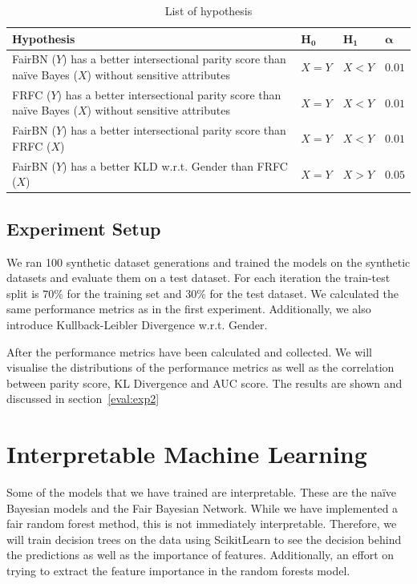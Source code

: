 \begin{table}
    \centering
    \begin{tabular}{p{10cm}lll}
        \hline
        \textbf{Hypothesis} & $\boldsymbol{H_0}$ & $\boldsymbol{H_1}$ & $\boldsymbol{\alpha}$ \\
        \hline
        \hline
        FairBN ($Y$) has a better intersectional parity score than naïve Bayes ($X$) without sensitive attributes & $X = Y$ & $X < Y$ & $0.01$ \\ \hline
        FRFC ($Y$) has a better intersectional parity score than naïve Bayes ($X$) without sensitive attributes & $X = Y$ & $X < Y$ & $0.01$ \\ \hline
        FairBN ($Y$) has a better intersectional parity score than FRFC ($X$) & $X = Y$ & $X < Y$ & $0.01$ \\ \hline
        FairBN ($Y$) has a better KLD w.r.t. Gender than FRFC ($X$) & $X = Y$ & $X > Y$ & $0.05$ \\ \hline
    \end{tabular}
    \caption{List of hypothesis}
    \label{tab:hypothesis}
\end{table}

\subsection{Experiment Setup}

We ran 100 synthetic dataset generations and trained the models on the synthetic datasets and evaluate them on a test dataset. For each iteration the train-test split is $70\%$ for the training set and $30\%$ for the test dataset. We calculated the same performance metrics as in the first experiment. Additionally, we also introduce Kullback-Leibler Divergence w.r.t. Gender. 

After the performance metrics have been calculated and collected. We will visualise the distributions of the performance metrics as well as the correlation between parity score, KL Divergence and AUC score. The results are shown and discussed in section~\ref{eval:exp2}

\section{Interpretable Machine Learning}

Some of the models that we have trained are interpretable. These are the naïve Bayesian models and the Fair Bayesian Network. While we have implemented a fair random forest method, this is not immediately interpretable. Therefore, we will train decision trees on the data using ScikitLearn to see the decision behind the predictions as well as the importance of features. Additionally, an effort on trying to extract the feature importance in the random forests model.


